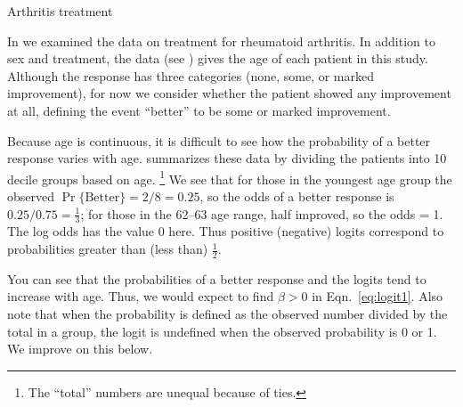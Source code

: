 \begin{Example}[arthrit6]{Arthritis treatment}

In  we examined the data
on treatment for rheumatoid arthritis.
In addition to sex and treatment, the data (see )
gives the age of each patient in this study.
Although the response has three categories (none, some, or marked
improvement), for now we consider whether the patient showed any
improvement at all, defining the event ``better'' to be some or
marked improvement.

Because age is continuous, it is difficult to see how the probability of
a better response varies with age.
 summarizes these data
by dividing the patients into 10 decile groups based on age.%
\footnote{The ``total'' numbers are unequal because of ties.}
We see that for those in the youngest age group the observed
$\Pr\{\textrm{Better}\} = 2/8 = 0.25$, so the odds of a better response
is $0.25 / 0.75 = \frac{1}{3}$;  for those in the 62--63 age range,
half improved, so the odds = 1.  The log odds has the value 0 here.
Thus positive (negative) logits correspond to probabilities greater than
(less than) $\frac{1}{2}$.

You can see that the probabilities of a better response
and the logits tend to increase
with age.  Thus, we would expect to find $\beta > 0$ in Eqn.~\eqref{eq:logit1}.
Also note that when the probability is defined as
the observed number divided by the total in a group, the logit is
undefined when the observed probability is 0 or 1.
We improve on this below.


\end{Example}
